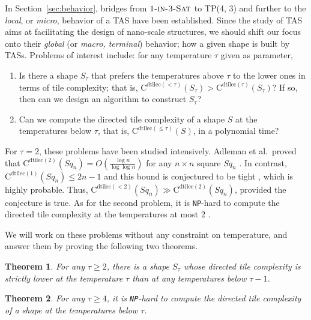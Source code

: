 \documentclass{article}
\newtheorem{theorem}{Theorem}
\theoremstyle{remark}
\theoremstyle{definition}
\newcommand{\dtilec}[1]{\ensuremath{\mathrm{C}^{\mathrm{dtilec}(#1)}}}
\newcommand{\SAT}{\ensuremath{\mbox{\sc Sat}}}
\newcommand{\oneinthree}{\ensuremath{\mbox{\sc 1-in-3-\SAT}}}
\newcommand{\NP}{{\tt NP}}
\renewcommand{\square}[1]{\ensuremath{\mathit{Sq}_{#1}}}
\begin{document}
In Section~\ref{sec:behavior}, bridges from $\oneinthree$ to TP(4, 3) and further to the {\it local}, or {\it micro}, behavior of a TAS have been established.  
Since the study of TAS aims at facilitating the design of nano-scale structures, we should shift our focus onto their {\it global} (or {\it macro, terminal}) behavior; how a given shape is built by TASs. 
Problems of interest include: for any temperature $\tau$ given as parameter, 
\begin{enumerate}
\item	Is there a shape $S_\tau$ that prefers the temperatures above $\tau$ to the lower ones in terms of tile complexity; that is, $\dtilec{< \tau}(S_\tau) > \dtilec{\tau}(S_\tau)$? 
	If so, then can we design an algorithm to construct $S_\tau$? 
\item	Can we compute the directed tile complexity of a shape $S$ at the temperatures below $\tau$, that is, $\dtilec{\le \tau}(S)$, in a polynomial time? 
\end{enumerate}
For $\tau = 2$, these problems have been studied intensively. 
Adleman et al.~proved that $\dtilec{2}(\square{n}) = O(\frac{\log n}{\log \log n})$ for any $n \times n$ square $\square{n}$ \cite{AdChGoHu2001}. 
In contrast, $\dtilec{1}(\square{n}) \le 2n-1$ and this bound is conjectured to be tight \cite{AdChGoHuKeEsRo2002}, which is highly probable. 
Thus, $\dtilec{< 2}(\square{n}) \gg \dtilec{2}(\square{n})$, provided the conjecture is true. 
As for the second problem, it is \NP-hard to compute the directed tile complexity at the temperatures at most 2 \cite{AdChGoHuKeEsRo2002}. 

We will work on these problems without any constraint on temperature, and answer them by proving the following two theorems. 

\begin{theorem}\label{thm:tau_better_than_less}
	For any $\tau \ge 2$, there is a shape $S_\tau$ whose directed tile complexity is strictly lower at the temperature $\tau$ than at any temperatures below $\tau-1$. 
\end{theorem}

\begin{theorem}\label{thm:TC_above_4_NPhard}
	For any $\tau \ge 4$, it is \NP-hard to compute the directed tile complexity of a shape at the temperatures below $\tau$. 
\end{theorem}
\end{document}
